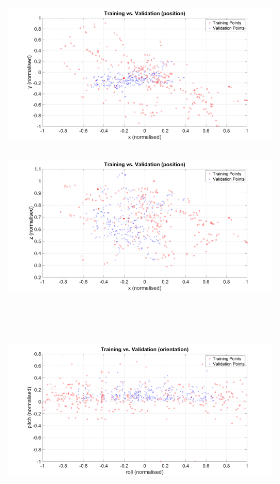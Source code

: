 \begin{figure}
  \centering
  \begin{subfigure}{\textwidth}
    \begin{subfigure}{0.48\textwidth}
      \includegraphics[clip, trim = 100 0 100 20, width=\textwidth]{figures/chapter4/tr_v_v_pos_xy}
    \end{subfigure}
    \begin{subfigure}{0.48\textwidth}
      \includegraphics[clip, trim = 100 0 100 20, width=\textwidth]{figures/chapter4/tr_v_v_pos_xz}
    \end{subfigure}
    \caption{}
  \end{subfigure}
  ~
  \begin{subfigure}{\textwidth}
    \begin{subfigure}{0.48\textwidth}
      \includegraphics[clip, trim = 100 0 100 20, width=\textwidth]{figures/chapter4/tr_v_v_pos_rollpitch}

\end{subfigure}
\end{subfigure}
\end{figure}
